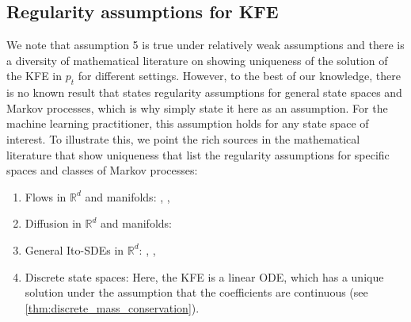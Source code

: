 \documentclass{fairmeta}
\numberwithin{equation}{section}
\begin{document}
\subsection{Regularity assumptions for KFE}
\label{appendix:regularity_assumptions_list}
We note that assumption 5 is true under relatively weak  assumptions and there is a diversity of mathematical literature on showing uniqueness of the solution of the KFE in $p_t$ for different settings. However, to the best of our knowledge, there is no known result that states regularity assumptions for general state spaces and Markov processes, which is why simply state it here as an assumption. For the machine learning practitioner, this assumption holds for any state space of interest. To illustrate this, we point the rich sources in the mathematical literature that show uniqueness that list the regularity assumptions  for specific spaces and classes of Markov processes:
\begin{enumerate}
\item Flows in $\mathbb{R}^d$ and manifolds: \citep[Mass conservation formula, page 15]{villani2009optimal}, \citep{diperna1989ordinary}, \citep{ambrosio2004transport}
\item Diffusion in $\mathbb{R}^d$ and manifolds: \citep[Diffusion theorem, page 16]{villani2009optimal}
\item General Ito-SDEs in $\mathbb{R}^d$: \citep[Theorem 1.3 and 1.4]{figalli2008existence}, \citep[Corollary 1.3]{kurtz2011equivalence}, \citep{bogachev2022fokker}
\item Discrete state spaces: Here, the KFE is a linear ODE, which has a unique solution under the assumption that the coefficients are continuous (see \cref{thm:discrete_mass_conservation}). 
\end{enumerate}
\end{document}
